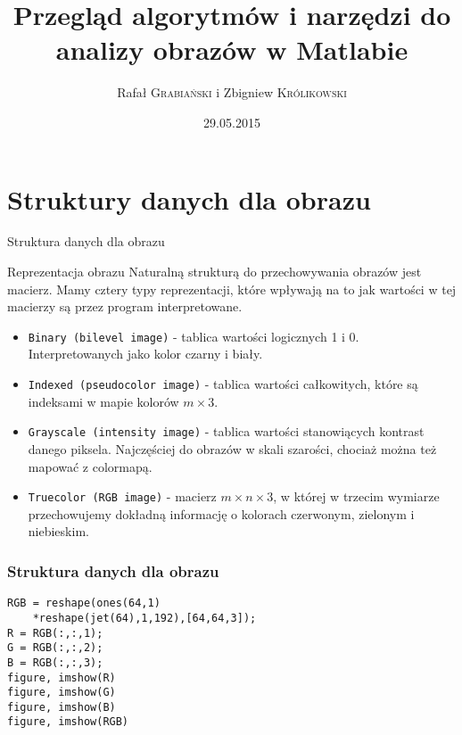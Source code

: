 \documentclass{beamer}
\title[Image Processing Toolbox]{Przegląd algorytmów i narzędzi do analizy obrazów w Matlabie}
\author{Rafał \textsc{Grabiański} i Zbigniew \textsc{Królikowski}}
\institute{}
\date{29.05.2015}
\begin{document}
\begin{frame}
  \titlepage
\end{frame}


\section{Struktury danych dla obrazu}

\begin{frame}{Struktura danych dla obrazu}

\begin{block}{Reprezentacja obrazu}
Naturalną strukturą do przechowywania obrazów jest macierz. Mamy cztery typy reprezentacji, które
wpływają na to jak wartości w tej macierzy są przez program interpretowane.
\end{block}


\begin{itemize}
  \item \texttt{Binary (bilevel image)} - tablica wartości logicznych 1 i 0. Interpretowanych jako kolor czarny i biały.
  \item \texttt{Indexed (pseudocolor image)} - tablica wartości całkowitych, które są indeksami w mapie kolorów $m \times 3$.
  \item \texttt{Grayscale (intensity image)} - tablica wartości stanowiących kontrast danego piksela. Najczęściej do obrazów w skali szarości, chociaż można też mapować z colormapą.
  \item \texttt{Truecolor (RGB image)} - macierz $m \times n \times 3$, w której w trzecim wymiarze przechowujemy dokładną informację o kolorach czerwonym, zielonym i niebieskim.
\end{itemize}

\end{frame}

\begin{frame}[fragile]
\frametitle{Struktura danych dla obrazu}

\begin{example}
\begin{lstlisting}
RGB = reshape(ones(64,1)
	*reshape(jet(64),1,192),[64,64,3]);
R = RGB(:,:,1);
G = RGB(:,:,2);
B = RGB(:,:,3);
figure,	imshow(R)
figure, imshow(G)
figure, imshow(B)
figure, imshow(RGB)
\end{lstlisting}
\end{example}

\end{frame}
\end{document}
